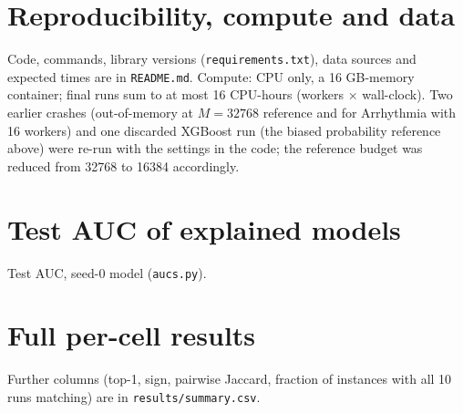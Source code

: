 \documentclass{article}
\begin{document}



\appendix
\section{Reproducibility, compute and data}\label{app:repro}
Code, commands, library versions (\texttt{requirements.txt}), data sources and expected times are in \texttt{README.md}. Compute: CPU only, a 16 GB-memory container; final runs sum to at most 16 CPU-hours (workers $\times$ wall-clock). Two earlier crashes (out-of-memory at $M{=}32768$ reference and for Arrhythmia with 16 workers) and one discarded XGBoost run (the biased probability reference above) were re-run with the settings in the code; the reference budget was reduced from 32768 to 16384 accordingly.

\section{Test AUC of explained models}\label{app:auc}
\begin{center}\small\end{center}
Test AUC, seed-0 model (\texttt{aucs.py}).

\section{Full per-cell results}
\begin{table}[h]\centering\scriptsize
\caption{Single-run top-3 match to reference, mean over 60 instances [95\% bootstrap CI]. Cells with $M\ge2^d-2$ are exhaustive (deterministic), so equal 1.00 up to reference noise. Source: \texttt{analyze.py}.}\label{tab:match}
\resizebox{\linewidth}{!}{}\end{table}
\begin{table}[h]\centering\scriptsize
\caption{Mean relative $\ell_2$ error to reference [95\% CI]. Zero entries are exhaustive regimes. Source: \texttt{analyze.py}.}
\resizebox{\linewidth}{!}{}\end{table}
Further columns (top-1, sign, pairwise Jaccard, fraction of instances with all 10 runs matching) are in \texttt{results/summary.csv}.

\newpage

\end{document}
